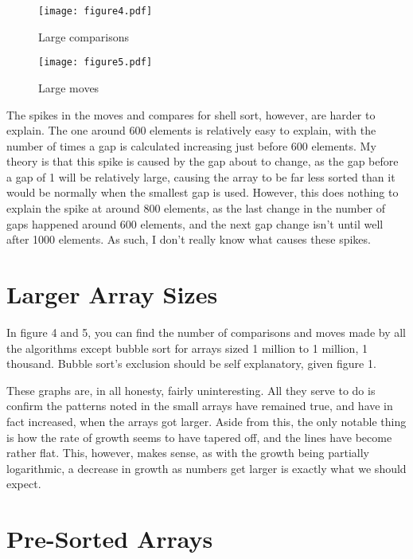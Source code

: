 \documentclass[11pt]{article}
\begin{document}
\begin{figure}[tbp]
\begin{centering}
\texttt{[image: figure4.pdf]}
\caption{Large comparisons}
\end{centering}
\end{figure}

\begin{figure}[tbp]
\begin{centering}
\texttt{[image: figure5.pdf]}
\caption{Large moves}
\end{centering}
\end{figure}

The spikes in the moves and compares for shell sort, however, are harder to explain. The one around 600 elements is relatively easy to explain, with the number of times a gap is calculated increasing just before 600 elements. My theory is that this spike is caused by the gap about to change, as the gap before a gap of 1 will be relatively large, causing the array to be far less sorted than it would be normally when the smallest gap is used. However, this does nothing to explain the spike at around 800 elements, as the last change in the number of gaps happened around 600 elements, and the next gap change isn't until well after 1000 elements. As such, I don't really know what causes these spikes.

\section{Larger Array Sizes}

In figure 4 and 5, you can find the number of comparisons and moves made by all the algorithms except bubble sort for arrays sized 1 million to 1 million, 1 thousand. Bubble sort's exclusion should be self explanatory, given figure 1.

These graphs are, in all honesty, fairly uninteresting. All they serve to do is confirm the patterns noted in the small arrays have remained true, and have in fact increased, when the arrays got larger. Aside from this, the only notable thing is how the rate of growth seems to have tapered off, and the lines have become rather flat. This, however, makes sense, as with the growth being partially logarithmic, a decrease in growth as numbers get larger is exactly what we should expect.

\section{Pre-Sorted Arrays}
\end{document}
